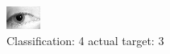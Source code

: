 \begin{figure}[h!]
\begin{center}
\includegraphics[width=0.60\columnwidth]{figures/ID1299_class_4_target_3.png}
\end{center}
\caption{ Classification: 4 actual target: 3}
\label{fig:ID1299_class_4_target_3}
\end{figure}
